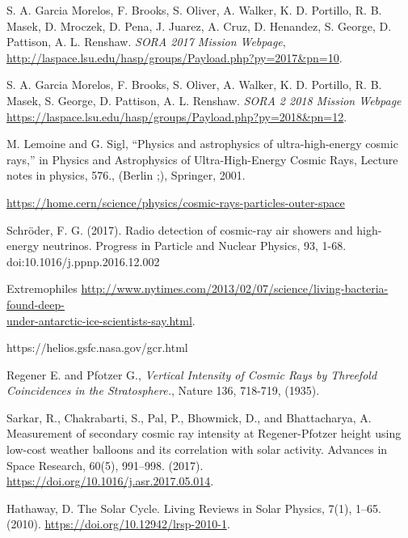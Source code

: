 \newpage

\begin{thebibliography}{9}

S. A. Garcia Morelos, F. Brooks, S. Oliver, A. Walker, K. D. Portillo, R. B. Masek, D. Mroczek, D. Pena, J. Juarez, A. Cruz, D. Henandez, S. George, D. Pattison, A. L. Renshaw. \textit{SORA 2017 Mission Webpage}, \url{http://laspace.lsu.edu/hasp/groups/Payload.php?py=2017&pn=10}.

S. A. Garcia Morelos, F. Brooks, S. Oliver, A. Walker, K. D. Portillo, R. B. Masek, S. George, D. Pattison, A. L. Renshaw. \textit{SORA 2 2018 Mission Webpage} \url{https://laspace.lsu.edu/hasp/groups/Payload.php?py=2018&pn=12}.

M. Lemoine and G. Sigl, “Physics and astrophysics of ultra-high-energy cosmic rays,” in
Physics and Astrophysics of Ultra-High-Energy Cosmic Rays, Lecture notes in physics, 576.,
(Berlin ;), Springer, 2001.

\url{https://home.cern/science/physics/cosmic-rays-particles-outer-space}

  Schröder, F. G. (2017). Radio detection of cosmic-ray air showers and high-energy neutrinos. Progress in Particle and Nuclear Physics, 93, 1-68. doi:10.1016/j.ppnp.2016.12.002

  Extremophiles \href{http://www.nytimes.com/2013/02/07/science/living-bacteria-found-deep-under-antarctic-ice-scientists-say.html}{http://www.nytimes.com/2013/02/07/science/living-bacteria-found-deep-\\under-antarctic-ice-scientists-say.html}.

  https://helios.gsfc.nasa.gov/gcr.html

  Regener E. and Pfotzer G., \textit{Vertical Intensity of Cosmic Rays by Threefold Coincidences in the Stratosphere.}, Nature 136, 718-719, (1935). 

  Sarkar, R., Chakrabarti, S., Pal, P., Bhowmick, D., and Bhattacharya, A. Measurement of secondary cosmic ray intensity at Regener-Pfotzer height using low-cost weather balloons and its correlation with solar activity. Advances in Space Research, 60(5), 991–998. (2017). \url{https://doi.org/10.1016/j.asr.2017.05.014}.

  Hathaway, D. The Solar Cycle. Living Reviews in Solar Physics, 7(1), 1–65. (2010). \url{https://doi.org/10.12942/lrsp-2010-1}.


\end{thebibliography}
